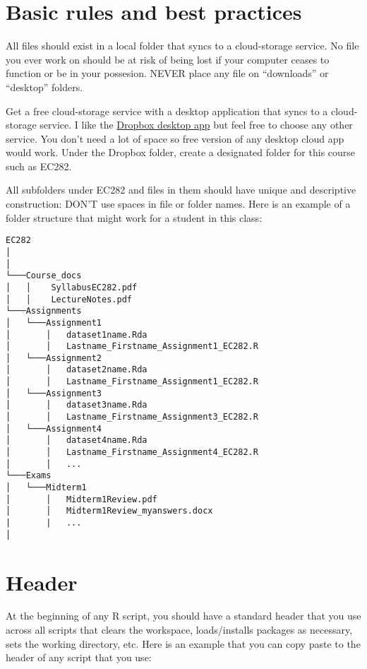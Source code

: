 \documentclass[
]{book}
\begin{document}
\hypertarget{basic-rules-and-best-practices}{%
\section{Basic rules and best practices}\label{basic-rules-and-best-practices}}

All files should exist in a local folder that syncs to a cloud-storage service. No file you ever work on should be at risk of being lost if your computer ceases to function or be in your possesion. NEVER place any file on ``downloads'' or ``desktop'' folders.

Get a free cloud-storage service with a desktop application that syncs to a cloud-storage service. I like the \href{https://help.dropbox.com/installs-integrations/desktop/desktop-application-overview}{Dropbox desktop app} but feel free to choose any other service. You don't need a lot of space so free version of any desktop cloud app would work. Under the Dropbox folder, create a designated folder for this course such as EC282.

All subfolders under EC282 and files in them should have unique and descriptive construction: DON'T use spaces in file or folder names. Here is an example of a folder structure that might work for a student in this class:

\begin{verbatim}
EC282
│  
│
└───Course_docs
│   │    SyllabusEC282.pdf
│   │    LectureNotes.pdf 
└───Assignments
│   └───Assignment1
│       │   dataset1name.Rda
│       │   Lastname_Firstname_Assignment1_EC282.R
│   └───Assignment2
│       │   dataset2name.Rda
│       │   Lastname_Firstname_Assignment1_EC282.R
│   └───Assignment3
│       │   dataset3name.Rda
│       │   Lastname_Firstname_Assignment3_EC282.R
│   └───Assignment4
│       │   dataset4name.Rda
│       │   Lastname_Firstname_Assignment4_EC282.R
│       │   ...
└───Exams
│   └───Midterm1
│       │   Midterm1Review.pdf
│       │   Midterm1Review_myanswers.docx
|       |   ...
│   
\end{verbatim}

\hypertarget{header}{%
\section{Header}\label{header}}

At the beginning of any R script, you should have a standard header that you use across all scripts that clears the workspace, loads/installs packages as necessary, sets the working directory, etc. Here is an example that you can copy paste to the header of any script that you use:
\end{document}
